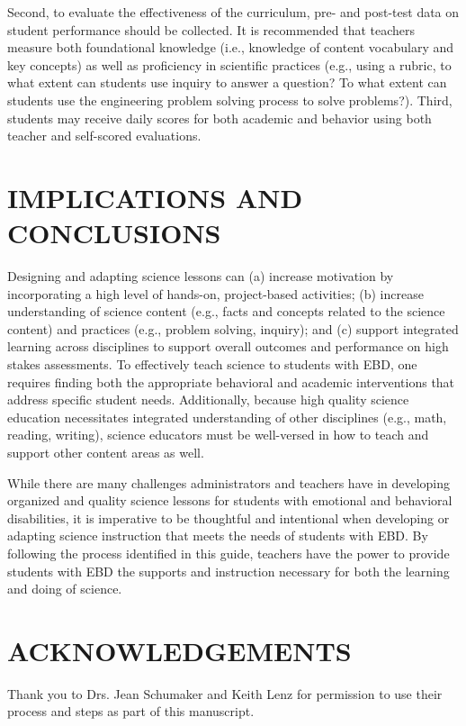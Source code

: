 \documentclass[11.5pt]{sig-alternate} %
\begin{document}
\begin{large}
Second, to evaluate the effectiveness of the curriculum, pre- and post-test data on student performance should be collected. It is recommended that teachers measure both foundational knowledge (i.e., knowledge of content vocabulary and key concepts) as well as proficiency in scientific practices (e.g., using a rubric, to what extent can students use inquiry to answer a question? To what extent can students use the engineering problem solving process to solve problems?). Third, students may receive daily scores for both academic and behavior using both teacher and self-scored evaluations. 

\section*{IMPLICATIONS AND CONCLUSIONS}

Designing and adapting science lessons can (a) increase motivation by incorporating a high level of hands-on, project-based activities; (b) increase understanding of science content (e.g., facts and concepts related to the science content) and practices (e.g., problem solving, inquiry); and (c) support integrated learning across disciplines to support overall outcomes and performance on high stakes assessments. To effectively teach science to students with EBD, one requires finding both the appropriate behavioral and academic interventions that address specific student needs. Additionally, because high quality science education necessitates integrated understanding of other disciplines (e.g., math, reading, writing), science educators must be well-versed in how to teach and support other content areas as well. 

While there are many challenges administrators and teachers have in developing organized and quality science lessons for students with emotional and behavioral disabilities, it is imperative to be thoughtful and intentional when developing or adapting science instruction that meets the needs of students with EBD. By following the process identified in this guide, teachers have the power to provide students with EBD the supports and instruction necessary for both the learning and doing of science.
 
\section*{ACKNOWLEDGEMENTS}
Thank you to Drs. Jean Schumaker and Keith Lenz for permission to use their process and steps as part of this manuscript.

\end{large}
\clearpage
\end{document}
